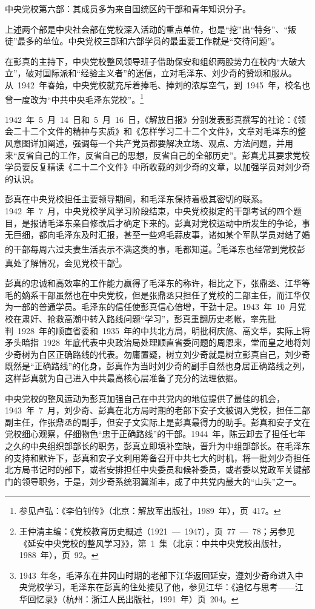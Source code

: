 中央党校第六部：其成员多为来自国统区的干部和青年知识分子。

上述两个部是中央社会部在党校深入活动的重点单位，也是“挖”出“特务”、“叛徒”最多的单位。中央党校三部和六部学员的最重要工作就是“交待问题”。

在彭真的主持下，中央党校整风领导班子借助保安和组织两股势力在校内“大破大立”，破对国际派和“经验主义者”的迷信，立对毛泽东、刘少奇的赞颂和服从。从~1942~年春始，中央党校就充斥着捧毛、捧刘的浓厚空气，到~1945~年，校名也曾一度改为“中共中央毛泽东党校”。\footnote{参见卢弘：《李伯钊传》（北京：解放军出版社，1989~年），页~417。}

1942~年~5~月~14~日和~5~月~16~日，《解放日报》分别发表彭真撰写的社论：《领会二十二个文件的精神与实质》和《怎样学习二十二个文件》，文章对毛泽东的整风意图详加阐述，强调每一个共产党员都要解决立场、观点、方法问题，并用来“反省自己的工作，反省自己的思想，反省自己的全部历史”。彭真尤其要求党校学员要反复精读《二十二个文件》中所收载的刘少奇的文章，以加强学员对刘少奇的认识。

彭真在中央党校担任主要领导期间，和毛泽东保持着极其密切的联系。1942~年~7~月，中央党校学风学习阶段结束，中央党校拟定的干部考试的四个题目，是报请毛泽东亲自修改后才确定下来的。彭真对党校运动中所发生的争论，事无巨细，都向毛泽东及时汇报，甚至一些鸡毛蒜皮事，诸如某个军队学员对结了婚的干部每周六过夫妻生活表示不满这类的事，毛都知道。\footnote{王仲清主编：《党校教育历史概述（1921~—~1947），页~77~—~78；另参见《延安中央党校的整风学习》》，第~1~集（北京：中共中央党校出版社，1988~年），页~92。}毛泽东也经常到党校彭真处了解情况，会见党校干部\footnote{1943~年冬，毛泽东在井冈山时期的老部下江华返回延安，遵刘少奇命进入中央党校学习，毛泽东在彭真的住处接见了他，参见江华：《追忆与思考——江华回忆录》（杭州：浙江人民出版社，1991~年）页~204。}。

彭真的忠诚和高效率的工作能力赢得了毛泽东的称许，相比之下，张鼎丞、江华等毛的嫡系干部虽然也在中央党校，但是张鼎丞只担任了党校的二部主任，而江华仅为一部的普通学员。毛泽东的信任使彭真信心倍增，干劲十足。1943~年~10~月党校在肃奸、抢救高潮中转入路线问题“学习”，彭真重翻历史老帐，率先批判~1928~年的顺直省委和~1935~年的中共北方局，明批柯庆施、高文华，实际上将矛头暗指~1928~年底代表中央政治局处理顺直省委问题的周恩来，堂而皇之地将刘少奇树为白区正确路线的代表。勿庸置疑，树立刘少奇就是树立彭真自己，刘少奇既然是“正确路线”的化身，彭真作为当时刘少奇的副手自然也身居正确路线之列，这样彭真就为自己进入中共最高核心层准备了充分的法理依据。

中央党校的整风运动为彭真加强自己在中共党内的地位提供了最佳的机会，1943~年~7~月，刘少奇、彭真在北方局时期的老部下安子文被调入党校，担任二部副主任，作张鼎丞的副手，但安子文实际上是彭真最得力的助手。彭真和安子文在党校细心观察，仔细物色“忠于正确路线”的干部。1944~年，陈云卸去了担任七年之久的中央组织部部长的职务，彭真立即填补空缺，晋升为中组部部长。在毛泽东的支持和默许下，彭真和安子文利用筹备召开中共七大的时机，将一批刘少奇担任北方局书记时的部下，或者安排担任中央委员和候补委员，或者委以党政军关键部门的领导职务，于是，刘少奇系统羽翼渐丰，成了中共党内最大的“山头”之一。

